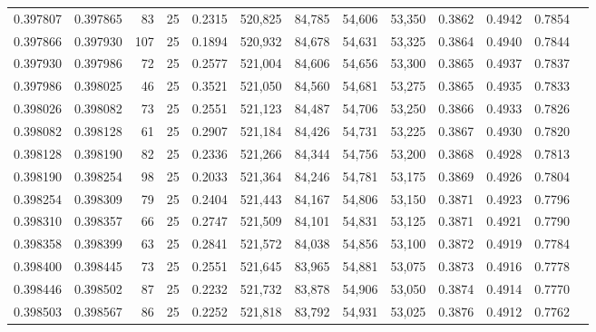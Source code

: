 \begin{tabular}{rrrrrrrrrrrrr}
0.397807 & 0.397865 &    83 &  25 &                                     0.2315 & 520,825 &  84,785 &  54,606 &  53,350 & 0.3862 & 0.4942 & 0.7854 \\
0.397866 & 0.397930 &   107 &  25 &                                     0.1894 & 520,932 &  84,678 &  54,631 &  53,325 & 0.3864 & 0.4940 & 0.7844 \\
0.397930 & 0.397986 &    72 &  25 &                                     0.2577 & 521,004 &  84,606 &  54,656 &  53,300 & 0.3865 & 0.4937 & 0.7837 \\
0.397986 & 0.398025 &    46 &  25 &                                     0.3521 & 521,050 &  84,560 &  54,681 &  53,275 & 0.3865 & 0.4935 & 0.7833 \\
0.398026 & 0.398082 &    73 &  25 &                                     0.2551 & 521,123 &  84,487 &  54,706 &  53,250 & 0.3866 & 0.4933 & 0.7826 \\
0.398082 & 0.398128 &    61 &  25 &                                     0.2907 & 521,184 &  84,426 &  54,731 &  53,225 & 0.3867 & 0.4930 & 0.7820 \\
0.398128 & 0.398190 &    82 &  25 &                                     0.2336 & 521,266 &  84,344 &  54,756 &  53,200 & 0.3868 & 0.4928 & 0.7813 \\
0.398190 & 0.398254 &    98 &  25 &                                     0.2033 & 521,364 &  84,246 &  54,781 &  53,175 & 0.3869 & 0.4926 & 0.7804 \\
0.398254 & 0.398309 &    79 &  25 &                                     0.2404 & 521,443 &  84,167 &  54,806 &  53,150 & 0.3871 & 0.4923 & 0.7796 \\
0.398310 & 0.398357 &    66 &  25 &                                     0.2747 & 521,509 &  84,101 &  54,831 &  53,125 & 0.3871 & 0.4921 & 0.7790 \\
0.398358 & 0.398399 &    63 &  25 &                                     0.2841 & 521,572 &  84,038 &  54,856 &  53,100 & 0.3872 & 0.4919 & 0.7784 \\
0.398400 & 0.398445 &    73 &  25 &                                     0.2551 & 521,645 &  83,965 &  54,881 &  53,075 & 0.3873 & 0.4916 & 0.7778 \\
0.398446 & 0.398502 &    87 &  25 &                                     0.2232 & 521,732 &  83,878 &  54,906 &  53,050 & 0.3874 & 0.4914 & 0.7770 \\
0.398503 & 0.398567 &    86 &  25 &                                     0.2252 & 521,818 &  83,792 &  54,931 &  53,025 & 0.3876 & 0.4912 & 0.7762 \\

\end{tabular}
